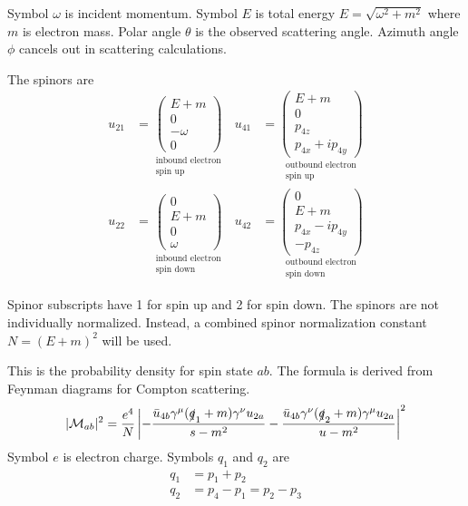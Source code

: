 \documentclass[12pt]{article}
\begin{document}
Symbol $\omega$ is incident momentum.
Symbol $E$ is total energy $E=\sqrt{\omega^2+m^2}$ where $m$ is electron mass.
Polar angle $\theta$ is the observed scattering angle.
Azimuth angle $\phi$ cancels out in scattering calculations.

\bigskip
The spinors are
\begin{align*}
u_{21}&=
\underset{\substack{\text{inbound electron}\\\text{spin up}}}
{
\begin{pmatrix}
E+m\\
0\\
-\omega\\
0
\end{pmatrix}
}
&
u_{41}&=
\underset{\substack{\text{outbound electron}\\\text{spin up}}}
{
\begin{pmatrix}
E+m\\
0\\
p_{4z}\\
p_{4x}+ip_{4y}
\end{pmatrix}
}
\\[1ex]
u_{22}&=
\underset{\substack{\text{inbound electron}\\\text{spin down}}}
{
\begin{pmatrix}
0\\
E+m\\
0\\
\omega
\end{pmatrix}
}
&
u_{42}&=
\underset{\substack{\text{outbound electron}\\\text{spin down}}}
{
\begin{pmatrix}
0\\
E+m\\
p_{4x}-ip_{4y}\\
-p_{4z}
\end{pmatrix}
}
\end{align*}

Spinor subscripts have 1 for spin up and 2 for spin down.
The spinors are not individually normalized.
Instead, a combined spinor normalization constant $N=(E+m)^2$ will be used.

\bigskip
This is the probability density for spin state $ab$.
The formula is derived from Feynman diagrams for Compton scattering.
\begin{equation*}
|\mathcal{M}_{ab}|^2
=
\frac{e^4}{N}
\left|
-\frac{\bar{u}_{4b}\gamma^\mu(\slashed{q}_1+m)\gamma^\nu u_{2a}}{s-m^2}
-\frac{\bar{u}_{4b}\gamma^\nu(\slashed{q}_2+m)\gamma^\mu u_{2a}}{u-m^2}
\right|^2
\end{equation*}
Symbol $e$ is electron charge.
Symbols $q_1$ and $q_2$ are
\begin{align*}
q_1&=p_1+p_2
\\
q_2&=p_4-p_1=p_2-p_3
\end{align*}
\end{document}
